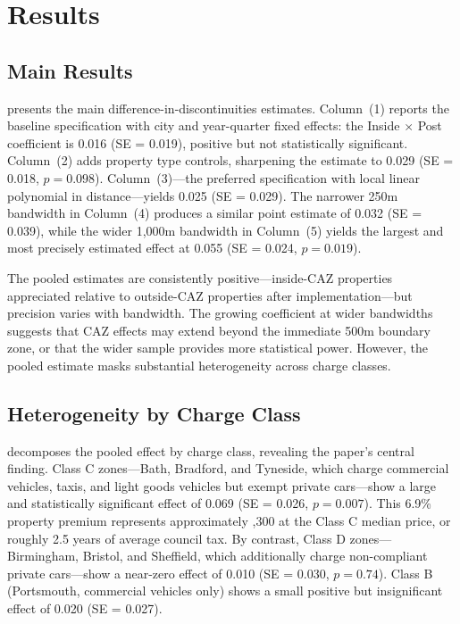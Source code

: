 \documentclass[12pt]{article}
\begin{document}
\section{Results}\label{sec:results}

\subsection{Main Results}



 presents the main difference-in-discontinuities estimates. Column~(1) reports the baseline specification with city and year-quarter fixed effects: the Inside $\times$ Post coefficient is 0.016 (SE = 0.019), positive but not statistically significant. Column~(2) adds property type controls, sharpening the estimate to 0.029 (SE = 0.018, $p = 0.098$). Column~(3)---the preferred specification with local linear polynomial in distance---yields 0.025 (SE = 0.029). The narrower 250m bandwidth in Column~(4) produces a similar point estimate of 0.032 (SE = 0.039), while the wider 1,000m bandwidth in Column~(5) yields the largest and most precisely estimated effect at 0.055 (SE = 0.024, $p = 0.019$).

The pooled estimates are consistently positive---inside-CAZ properties appreciated relative to outside-CAZ properties after implementation---but precision varies with bandwidth. The growing coefficient at wider bandwidths suggests that CAZ effects may extend beyond the immediate 500m boundary zone, or that the wider sample provides more statistical power. However, the pooled estimate masks substantial heterogeneity across charge classes.

\subsection{Heterogeneity by Charge Class}



 decomposes the pooled effect by charge class, revealing the paper's central finding. Class C zones---Bath, Bradford, and Tyneside, which charge commercial vehicles, taxis, and light goods vehicles but exempt private cars---show a large and statistically significant effect of 0.069 (SE = 0.026, $p = 0.007$). This 6.9\% property premium represents approximately ,300 at the Class C median price, or roughly 2.5 years of average council tax. By contrast, Class D zones---Birmingham, Bristol, and Sheffield, which additionally charge non-compliant private cars---show a near-zero effect of 0.010 (SE = 0.030, $p = 0.74$). Class B (Portsmouth, commercial vehicles only) shows a small positive but insignificant effect of 0.020 (SE = 0.027).
\end{document}
